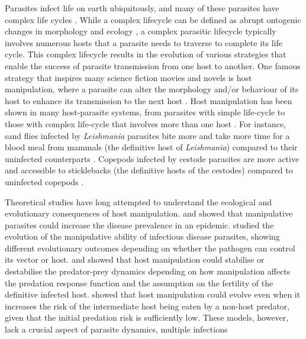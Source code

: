 \documentclass[11pt]{article}
\begin{document}
Parasites infect life on earth ubiquitously, and many of these parasites have complex life cycles \citep{zimmer:book:2001}. 
While a complex lifecycle can be defined as abrupt ontogenic changes in morphology and ecology \citep{Benesh:2016dj}, a complex parasitic lifecycle typically involves numerous hosts that a parasite needs to traverse to complete its life cycle. 
This complex lifecycle results in the evolution of various strategies that enable the success of parasite transmission from one host to another. 
One famous strategy that inspires many science fiction movies and novels is host manipulation, where a parasite can alter the morphology and/or behaviour of its  host to enhance its transmission to the next host \citep{Hughes2012}. 
Host manipulation has been shown in many host-parasite systems, from parasites with simple life-cycle to those with complex life-cycle that involves more than one host \citep{Hughes2012,molyneux_jefferies1986}. 
For instance, sand flies infected by \textit{Leishmania} parasites bite more and take more time for a blood meal from mammals (the definitive host of \textit{Leishmania}) compared to their uninfected counterparts \citep{Rogers2007}. 
Copepods infected by cestode parasites are more active and accessible to sticklebacks (the definitive hosts of the cestodes) compared to uninfected copepods \citep{Wedekind1996}.

Theoretical studies have long attempted to understand the ecological and evolutionary consequences of host manipulation. 
\cite{Roosien2013} and \cite{Hosack2008} showed that manipulative parasites could increase the disease prevalence in an epidemic. \cite{Gandon2018} studied the evolution of the manipulative ability of infectious disease parasites, showing different evolutionary outcomes depending on whether the pathogen can control its vector or host.
\cite{Hadeler1989, Fenton2006} and \cite{Rogawa2018} showed that host manipulation could stabilise or destabilise the predator-prey dynamics depending on how manipulation affects the predation response function and the assumption on the fertility of the definitive infected host. \cite{Seppl2008} showed that host manipulation could evolve even when it increases the risk of the intermediate host being eaten by a non-host predator, given that the initial predation risk is sufficiently low. 
These models, however, lack a crucial aspect of parasite dynamics, multiple infections \citep{kalbe:JFB:2002} 
\end{document}
